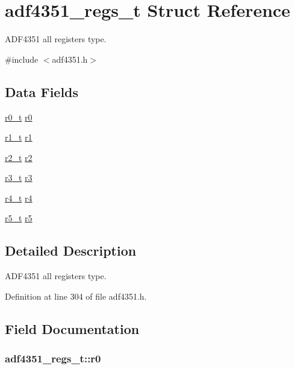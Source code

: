 \hypertarget{structadf4351__regs__t}{}\section{adf4351\+\_\+regs\+\_\+t Struct Reference}
\label{structadf4351__regs__t}


A\+D\+F4351 all registers type.  




{\ttfamily \#include $<$adf4351.\+h$>$}

\subsection*{Data Fields}
\begin{DoxyCompactItemize}
\item 
\hyperlink{structr0__t}{r0\+\_\+t} \hyperlink{structadf4351__regs__t_af58eb2d998c67713353ba39c89c9b4b2}{r0}
\item 
\hyperlink{structr1__t}{r1\+\_\+t} \hyperlink{structadf4351__regs__t_a9e35aa252797cdae6d46ae0daad2bc40}{r1}
\item 
\hyperlink{structr2__t}{r2\+\_\+t} \hyperlink{structadf4351__regs__t_af6667dbbd7434e0394cc9f569d3e24bb}{r2}
\item 
\hyperlink{structr3__t}{r3\+\_\+t} \hyperlink{structadf4351__regs__t_a1aa968491b1182f3ae4f426ef5c1b83a}{r3}
\item 
\hyperlink{structr4__t}{r4\+\_\+t} \hyperlink{structadf4351__regs__t_a343af9ab05747dd9b977603d02ebb4df}{r4}
\item 
\hyperlink{structr5__t}{r5\+\_\+t} \hyperlink{structadf4351__regs__t_ab0bd52a2f47aa3f45d0aa97136ec6e8c}{r5}
\end{DoxyCompactItemize}


\subsection{Detailed Description}
A\+D\+F4351 all registers type. 

Definition at line 304 of file adf4351.\+h.



\subsection{Field Documentation}
\subsubsection[{\texorpdfstring{r0}{r0}}]{ adf4351\+\_\+regs\+\_\+t\+::r0}\hypertarget{structadf4351__regs__t_af58eb2d998c67713353ba39c89c9b4b2}{}\label{structadf4351__regs__t_af58eb2d998c67713353ba39c89c9b4b2}


